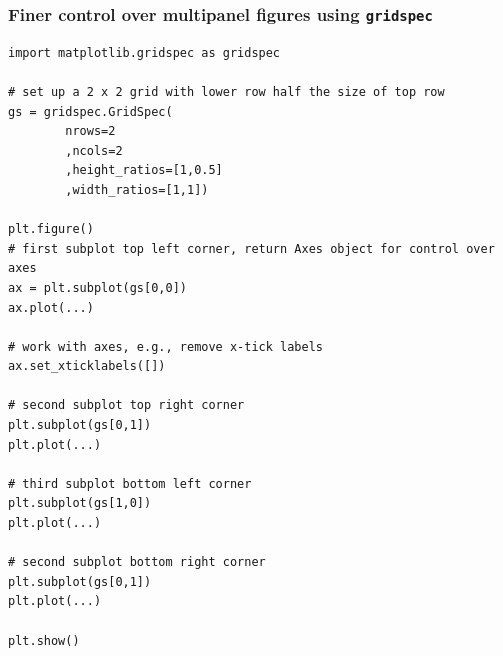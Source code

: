 \documentclass[xcolor=table]{beamer}
\begin{document}
\begin{frame}[fragile]
    \frametitle{Finer control over multipanel figures using \texttt{gridspec}}
    \begin{lstlisting}[style=pythonsmall]
import matplotlib.gridspec as gridspec

# set up a 2 x 2 grid with lower row half the size of top row
gs = gridspec.GridSpec(
        nrows=2
        ,ncols=2
        ,height_ratios=[1,0.5]
        ,width_ratios=[1,1])

plt.figure()
# first subplot top left corner, return Axes object for control over axes
ax = plt.subplot(gs[0,0])
ax.plot(...)

# work with axes, e.g., remove x-tick labels
ax.set_xticklabels([])
 
# second subplot top right corner
plt.subplot(gs[0,1])
plt.plot(...)

# third subplot bottom left corner
plt.subplot(gs[1,0])
plt.plot(...)
 
# second subplot bottom right corner
plt.subplot(gs[0,1])
plt.plot(...)

plt.show()
    \end{lstlisting}
\end{frame}
\end{document}
